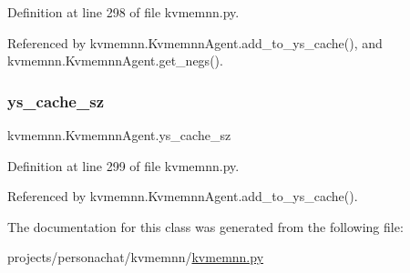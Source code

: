 Definition at line 298 of file kvmemnn.\+py.



Referenced by kvmemnn.\+Kvmemnn\+Agent.\+add\+\_\+to\+\_\+ys\+\_\+cache(), and kvmemnn.\+Kvmemnn\+Agent.\+get\+\_\+negs().

\mbox{\label{classkvmemnn_1_1KvmemnnAgent_af48143451b92d842a0cb5963f439f6e7}} 
\subsubsection{\texorpdfstring{ys\+\_\+cache\+\_\+sz}{ys\_cache\_sz}}
{\footnotesize\ttfamily kvmemnn.\+Kvmemnn\+Agent.\+ys\+\_\+cache\+\_\+sz}



Definition at line 299 of file kvmemnn.\+py.



Referenced by kvmemnn.\+Kvmemnn\+Agent.\+add\+\_\+to\+\_\+ys\+\_\+cache().



The documentation for this class was generated from the following file\+:\begin{DoxyCompactItemize}
\item 
projects/personachat/kvmemnn/\hyperlink{projects_2personachat_2kvmemnn_2kvmemnn_8py}{kvmemnn.\+py}\end{DoxyCompactItemize}
